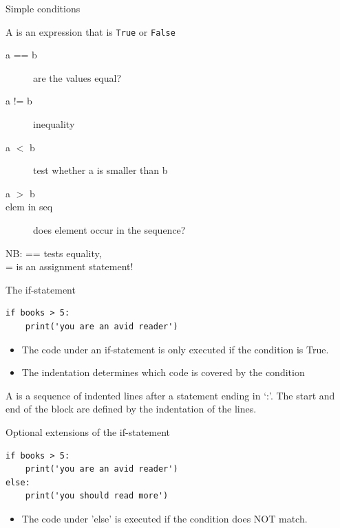 \documentclass[aspectratio=169,usenames,dvipsnames]{beamer}
\begin{document}
\begin{frame}{Simple conditions}
    \begin{definition}
        A  is
        an expression that is \texttt{True} or \texttt{False}
    \end{definition}
    \begin{description}
        \item[a == b] are the values equal?
        \item[a != b] inequality
        \item[a $<$ b] test whether a is smaller than b
        \item[a $>$ b]
        \item[elem in seq] does element occur in the sequence?
    \end{description}

    NB: == tests equality, \\
        = is an assignment statement!
\end{frame}

\begin{frame}[fragile]{The if-statement}
\begin{lstlisting}
if books > 5:
    print('you are an avid reader')
\end{lstlisting}

    \begin{itemize}
        \item The code under an if-statement is only executed
            if the condition is True.
        \item The indentation determines which code is covered
            by the condition
    \end{itemize}

    \pause
    \begin{definition}
        A  is a sequence of indented lines after
        a statement ending in `:'.
        The start and end of the block are defined by the indentation of the
        lines.
    \end{definition}
\end{frame}


\begin{frame}[fragile]{Optional extensions of the if-statement}
\begin{lstlisting}
if books > 5:
    print('you are an avid reader')
else:
    print('you should read more')
\end{lstlisting}

\begin{itemize}
    \item The code under 'else' is executed if the condition does NOT match.
\end{itemize}
\end{frame}
\end{document}
